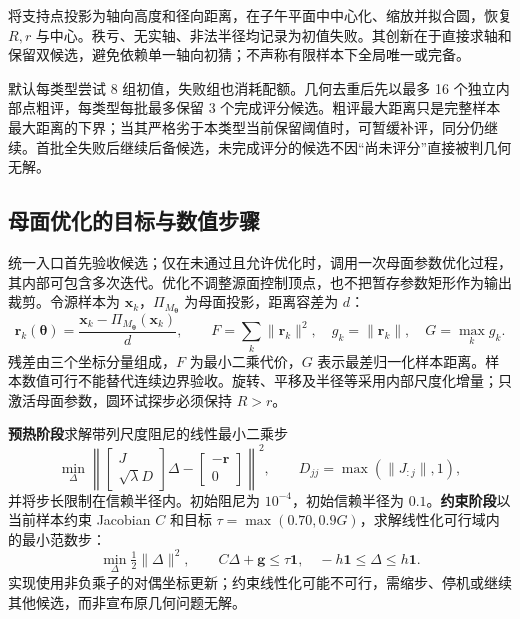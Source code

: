 \documentclass[UTF8,zihao=5,fontset=windows,a4paper]{ctexart}
\begin{document}
将支持点投影为轴向高度和径向距离，在子午平面中中心化、缩放并拟合圆，恢复 $R,r$ 与中心。秩亏、无实轴、非法半径均记录为初值失败。其创新在于直接求轴和保留双候选，避免依赖单一轴向初猜；不声称有限样本下全局唯一或完备。

默认每类型尝试 8 组初值，失败组也消耗配额。几何去重后先以最多 16 个独立内部点粗评，每类型每批最多保留 3 个完成评分候选。粗评最大距离只是完整样本最大距离的下界；当其严格劣于本类型当前保留阈值时，可暂缓补评，同分仍继续。首批全失败后继续后备候选，未完成评分的候选不因“尚未评分”直接被判几何无解。

\begin{center}
\end{center}

\newpage
\subsection{母面优化的目标与数值步骤}
统一入口首先验收候选；仅在未通过且允许优化时，调用一次母面参数优化过程，其内部可包含多次迭代。优化不调整源面控制顶点，也不把暂存参数矩形作为输出裁剪。令源样本为 $\mathbf x_k$，$\Pi_{M_{\boldsymbol\theta}}$ 为母面投影，距离容差为 $d$：
\begin{equation}\label{eq:objective}
\mathbf r_k(\boldsymbol\theta)=\frac{\mathbf x_k-\Pi_{M_{\boldsymbol\theta}}(\mathbf x_k)}{d},\qquad
F=\sum_k\|\mathbf r_k\|^2,\quad g_k=\|\mathbf r_k\|,\quad G=\max_k g_k.
\end{equation}
残差由三个坐标分量组成，$F$ 为最小二乘代价，$G$ 表示最差归一化样本距离。样本数值可行不能替代连续边界验收。旋转、平移及半径等采用内部尺度化增量；只激活母面参数，圆环试探步必须保持 $R>r$。

\textbf{预热阶段}求解带列尺度阻尼的线性最小二乘步
\[
\min_{\Delta}\left\|\begin{bmatrix}J\\ \sqrt\lambda D\end{bmatrix}\Delta-
\begin{bmatrix}-\mathbf r\\0\end{bmatrix}\right\|^2,
\qquad D_{jj}=\max(\|J_{:j}\|,1),
\]
并将步长限制在信赖半径内。初始阻尼为 $10^{-4}$，初始信赖半径为 $0.1$。\textbf{约束阶段}以当前样本约束 Jacobian $C$ 和目标 $\tau=\max(0.70,0.9G)$，求解线性化可行域内的最小范数步：
\[
\min_{\Delta}\tfrac12\|\Delta\|^2,
\qquad C\Delta+\mathbf g\le\tau\mathbf1,\quad -h\mathbf1\le\Delta\le h\mathbf1.
\]
实现使用非负乘子的对偶坐标更新；约束线性化可能不可行，需缩步、停机或继续其他候选，而非宣布原几何问题无解。
\end{document}
